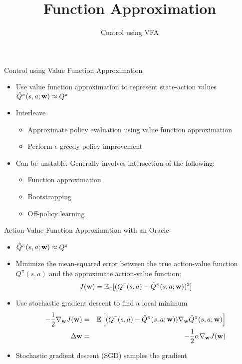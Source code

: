 \documentclass[aspectratio=169]{../latex_main/tntbeamer}  %
\title[RL: Function Approximation]{Function Approximation}
\subtitle{Control using VFA}
\begin{document}
	
	\maketitle

\begin{frame}[c]{Control using Value Function Approximation}
	
	\begin{itemize}
		\item Use value function approximation to represent state-action values $\hat{Q}^\pi(s,a;\mathbf{w}) \approx Q^\pi$
		\item Interleave
		\begin{itemize}
			\item Approximate policy evaluation using value function approximation
			\item Perform $\epsilon$-greedy policy improvement
		\end{itemize}
		\item Can be unstable. Generally involves intersection of the following:
		\begin{itemize}
			\item Function approximation
			\item Bootstrapping
			\item \alert{Off-policy learning}
		\end{itemize}
	\end{itemize}

\end{frame}
\begin{frame}[c]{Action-Value Function Approximation with an Oracle}
	
	\begin{itemize}
		\item $\hat{Q}^\pi(s,a;\mathbf{w}) \approx Q^\pi$
		\item Minimize the mean-squared error between the true action-value function $Q^\pi(s,a)$ and the approximate action-value function:
		$$J(\mathbf{w}) = \mathbb{E}_\pi [(Q^\pi(s,a) - \hat{Q}^\pi(s,a;\mathbf{w}))^2] $$
		\item Use stochastic gradient descent to find a local minimum
		\begin{eqnarray}
			-\frac{1}{2}\nabla_{\mathbf{w}} J(\mathbf{w}) &=& \mathbb{E}\left[ (Q^\pi(s,a) - \hat{Q}^\pi(s,a;\mathbf{w})) \nabla_{\mathbf{w}} \hat{Q}^\pi(s,a;\mathbf{w}) \right]\nonumber\\
			\Delta \mathbf{w} &=& -\frac{1}{2}\alpha\nabla_{\mathbf{w}} J(\mathbf{w})\nonumber
		\end{eqnarray}
		\item Stochastic gradient descent (SGD) samples the gradient
	\end{itemize}
	
\end{frame}
\end{document}
